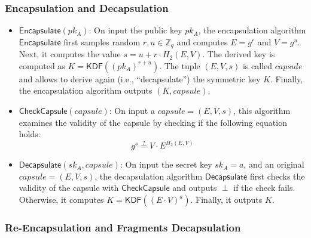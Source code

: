 \documentclass{amsart}
\begin{document}
\subsubsection{Encapsulation and Decapsulation}

\begin{itemize}
	\item $\mathsf{Encapsulate}(pk_A)$: On input the public key $pk_A$, the encapsulation algorithm $\mathsf{Encapsulate}$ first samples random $r, u \in \mathbb Z_q$ and computes $E = g^r$ and $V = g^u$. 
	Next, it computes the value $s = u + r \cdot H_2(E, V)$. 
	The derived key is computed as $K = \mathsf{KDF}((pk_A)^{r + u})$. 
	The tuple $(E, V, s)$ is called $capsule$ and allows to derive again (i.e., ``decapsulate'') the symmetric key $K$. 
	Finally, the encapsulation algorithm outputs $(K, capsule)$.	
	
	\item $\mathsf{CheckCapsule}(capsule)$: On input a $capsule = (E, V, s)$, this algorithm examines the validity of the capsule by checking if the following equation holds:
	$$ g^s \stackrel{?}{=} V \cdot E^{H_2(E, V)}$$
	
	\item $\mathsf{Decapsulate}(sk_A, capsule)$: On input the secret key $sk_A = a$, and an original $capsule = (E,V,s)$, the decapsulation algorithm $\mathsf{Decapsulate}$ first checks the validity of the capsule with $\mathsf{CheckCapsule}$ and outputs $\perp$ if the check fails. Otherwise, it computes $K = \mathsf{KDF}((E\cdot V)^{a})$. Finally, it outputs $K$.
	
	\end{itemize}

\subsubsection{Re-Encapsulation and Fragments Decapsulation}%
\end{document}
